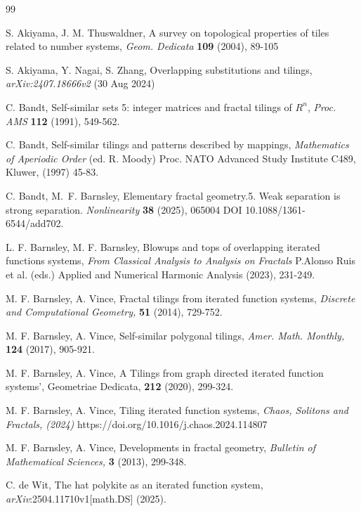 \documentclass{amsproc}%
\theoremstyle{plain}
\theoremstyle{definition}
\numberwithin{equation}{section}
\begin{document}
\begin{thebibliography}{99}                                                                                               %


S. Akiyama, J. M. Thuswaldner, A survey on topological
properties of tiles related to number systems, \textit{Geom. Dedicata
}\textbf{109 }(2004), 89-105

S. Akiyama, Y. Nagai, S. Zhang, Overlapping substitutions
and tilings, \textit{arXiv:2407.18666v2 }(30 Aug 2024)

C. Bandt, Self-similar sets 5: integer matrices and fractal
tilings of $R^{n}$, \textit{Proc. AMS} \textbf{112 }(1991), 549-562.

C. Bandt, Self-similar tilings and patterns described by
mappings, \textit{Mathematics of Aperiodic Order }(ed. R. Moody) Proc. NATO
Advanced Study Institute C489, Kluwer, (1997) 45-83.

C. Bandt, M.\ F. Barnsley, Elementary fractal geometry.5.
Weak separation is strong separation. \textit{Nonlinearity }\textbf{38
}(2025),\textbf{ }065004 DOI 10.1088/1361-6544/add702.

L. F. Barnsley, M. F. Barnsley, Blowups and tops of overlapping
iterated functions systems, \textit{From Classical Analysis to Analysis on
Fractals} P.Alonso Ruis et al. (eds.) Applied and Numerical Harmonic Analysis
(2023), 231-249.

M. F. Barnsley, A. Vince, Fractal tilings from iterated
function systems, \textit{Discrete and Computational Geometry, }\textbf{51}
(2014), 729-752.

M. F. Barnsley, A. Vince, Self-similar polygonal tilings,
\textit{Amer. Math. Monthly, }\textbf{124 }(2017), 905-921.

M. F. Barnsley, A. Vince, A Tilings from graph directed
iterated function systems', Geometriae Dedicata, \textbf{212} (2020), 299-324.

M. F. Barnsley, A. Vince, Tiling iterated function
systems, \textit{Chaos, Solitons and Fractals, (2024) }https://doi.org/10.1016/j.chaos.2024.114807

M. F. Barnsley, A. Vince, Developments in fractal
geometry,\textit{ Bulletin of Mathematical Sciences, }\textbf{3} (2013), 299-348.

C. de Wit, The hat polykite as an iterated function system,
\textit{arXiv}:2504.11710v1[math.DS] (2025).


\end{thebibliography}
\end{document}
